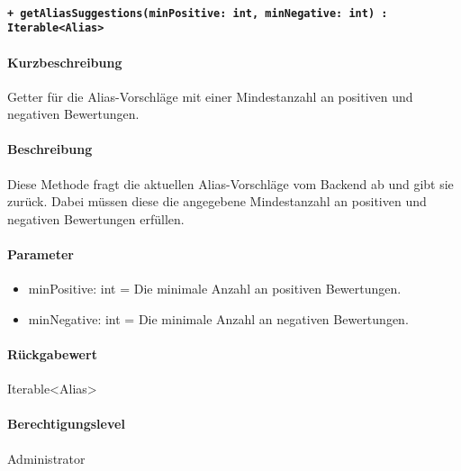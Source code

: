 \paragraph{\texttt{+ getAliasSuggestions(minPositive: int, minNegative: int) : Iterable<Alias>}}%
\paragraph*{Kurzbeschreibung}
Getter für die Alias-Vorschläge mit einer Mindestanzahl an positiven und negativen Bewertungen.
\paragraph*{Beschreibung}
Diese Methode fragt die aktuellen Alias-Vorschläge vom Backend ab und gibt sie zurück.
Dabei müssen diese die angegebene Mindestanzahl an positiven und negativen Bewertungen erfüllen.
\paragraph*{Parameter}
\begin{itemize}
    \item minPositive: int = Die minimale Anzahl an positiven Bewertungen.
    \item minNegative: int = Die minimale Anzahl an negativen Bewertungen.
\end{itemize}
\paragraph*{Rückgabewert}
Iterable<Alias>
\paragraph*{Berechtigungslevel}
Administrator